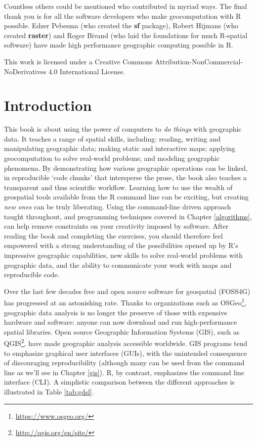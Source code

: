 \documentclass[]{krantz}
\let\rmarkdownfootnote\footnote%
\def\footnote{\protect\rmarkdownfootnote}
\renewcommand{\href}[2]{#2\footnote{\url{#1}}}
\begin{document}
Countless others could be mentioned who contributed in myriad ways.
The final thank you is for all the software developers who make geocomputation with R possible.
Edzer Pebesma (who created the \textbf{sf} package), Robert Hijmans (who created \textbf{raster}) and Roger Bivand (who laid the foundations for much R-spatial software) have made high performance geographic computing possible in R.

This work is licensed under a Creative Commons Attribution-NonCommercial-NoDerivatives 4.0 International License.

\hypertarget{intro}{%
\section{Introduction}\label{intro}}

This book is about using the power of computers to \emph{do things} with geographic data.
It teaches a range of spatial skills, including: reading, writing and manipulating geographic data; making static and interactive maps; applying geocomputation to solve real-world problems; and modeling geographic phenomena.
By demonstrating how various geographic operations can be linked, in reproducible `code chunks' that intersperse the prose, the book also teaches a transparent and thus scientific workflow.
Learning how to use the wealth of geospatial tools available from the R command line can be exciting, but creating \emph{new ones} can be truly liberating.
Using the command-line driven approach taught throughout, and programming techniques covered in Chapter \ref{algorithms}, can help remove constraints on your creativity imposed by software.
After reading the book and completing the exercises, you should therefore feel empowered with
a strong understanding of the possibilities opened up by R's impressive geographic capabilities,
new skills to solve real-world problems with geographic data,
and the ability to communicate your work with maps and reproducible code.

Over the last few decades free and open source software for geospatial (FOSS4G) has progressed at an astonishing rate.
Thanks to organizations such as \href{https://www.osgeo.org/}{OSGeo}, geographic data analysis is no longer the preserve of those with expensive hardware and software: anyone can now download and run high-performance spatial libraries.
Open source Geographic Information Systems (GIS), such as \href{http://qgis.org/en/site/}{QGIS}, have made geographic analysis accessible worldwide.
GIS programs tend to emphasize graphical user interfaces (GUIs), with the unintended consequence of discouraging reproducibility (although many can be used from the command line as we'll see in Chapter \ref{gis}).
R, by contrast, emphasizes the command line interface (CLI).
A simplistic comparison between the different approaches is illustrated in Table \ref{tab:gdsl}.
\end{document}
